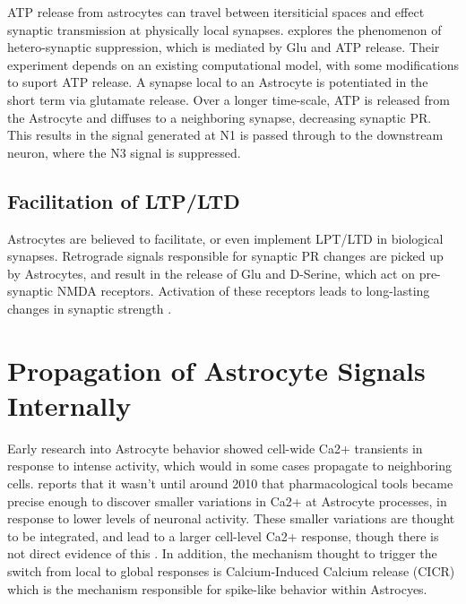     ATP release from astrocytes can travel between itersiticial spaces and
    effect synaptic transmission at physically local
    synapses. \cite{postnov_2009} explores the phenomenon of hetero-synaptic
    suppression, which is mediated by Glu and ATP release. Their experiment
    depends on an existing computational model, with some modifications to
    suport ATP release. A synapse local to an Astrocyte is potentiated in the
    short term via glutamate release. Over a longer time-scale, ATP is released
    from the Astrocyte and diffuses to a neighboring synapse, decreasing
    synaptic PR. This results in the signal generated at N1 is passed through to
    the downstream neuron, where the N3 signal is suppressed.

    \subsection{Facilitation of LTP/LTD}
    Astrocytes are believed to facilitate, or even implement LPT/LTD in
    biological synapses. Retrograde signals responsible for synaptic PR changes
    are picked up by Astrocytes, and result in the release of Glu and D-Serine,
    which act on pre-synaptic NMDA receptors. Activation of these receptors
    leads to long-lasting changes in synaptic strength \cite{min_2012}.

    \section{Propagation of Astrocyte Signals Internally}
    Early research into Astrocyte behavior showed cell-wide Ca2+ transients in
    response to intense activity, which would in some cases propagate to
    neighboring cells. \cite{manninen_2018} reports that it wasn't until around
    2010 that pharmacological tools became precise enough to discover smaller
    variations in Ca2+ at Astrocyte processes, in response to lower levels of
    neuronal activity. These smaller variations are thought to be integrated,
    and lead to a larger cell-level Ca2+ response, though there is not direct
    evidence of this \cite{araque_2014}. In addition, the mechanism thought to
    trigger the switch from local to global responses is Calcium-Induced Calcium
    release (CICR) which is the mechanism responsible for spike-like behavior
    within Astrocyes.
    
